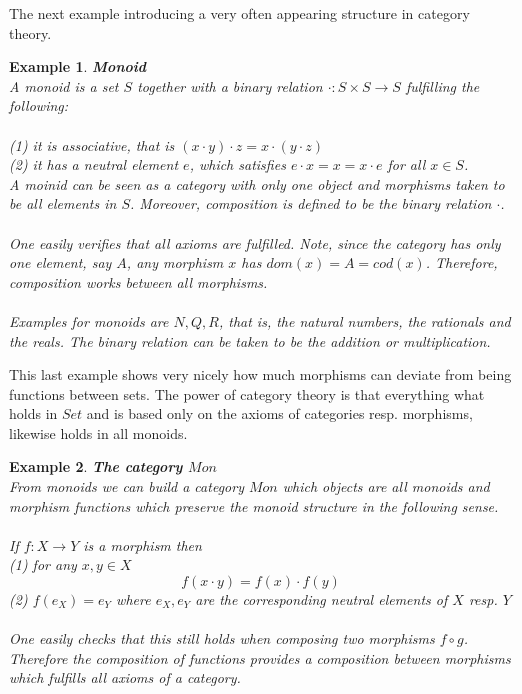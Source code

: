 \documentclass[17pt]{extarticle}
\newtheorem{example}{Example}
\begin{document}
The next example introducing a very often appearing structure in category theory.\\
\begin{example}
	\textbf{Monoid}\\
	A monoid is a set $S$ together with a binary relation $\cdot:S\times S\rightarrow S$ fulfilling the following:\\ \\
	(1) it is associative, that is $(x\cdot y)\cdot z = x\cdot (y\cdot z)$\\
	(2) it has a neutral element $e$, which satisfies $e\cdot x=x=x\cdot e$ for all $x\in S$.\\
	
	A moinid can be seen as a category with only one object and morphisms taken to be all elements in $S$. Moreover, composition is defined to be the binary relation $\cdot$.\\ \\
	One easily verifies that all axioms are fulfilled. Note, since the category has only one element, say $A$, any morphism $x$ has $dom(x)=A=cod(x)$. Therefore, composition works between all morphisms.\\ \\
	Examples for monoids are $N, Q, R$, that is, the natural numbers, the rationals and the reals.
	The binary relation can be taken to be the addition or multiplication.
\end{example}

This last example shows very nicely how much morphisms can deviate from being functions between sets. The power of category theory is that everything what holds in $Set$ and is based only on the axioms of categories resp. morphisms, likewise holds in all monoids.

\begin{example}
	\textbf{The category $Mon$}\\
	From monoids we can build a category $Mon$ which objects are all monoids and morphism functions which preserve the monoid structure in the following sense.\\ \\
	If $f:X\rightarrow Y$ is a morphism then \\ 
	(1) for any $x,y\in X$
	$$
	f(x\cdot y)=f(x)\cdot f(y)
	$$
	(2) $f(e_X)=e_Y$ where $e_X, e_Y$ are the corresponding neutral elements of $X$ resp. $Y$ \\ \\
	One easily checks that this still holds when composing two morphisms $f\circ g$. Therefore the composition of functions provides a composition between morphisms which fulfills all axioms of a category.\\	
\end{example}
\end{document}
